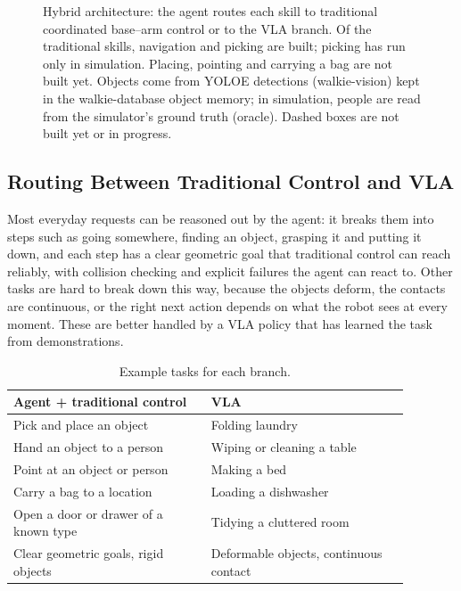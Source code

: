 \documentclass[12pt,a4paper]{article}
\begin{document}
\begin{figure}[H]
    \caption{\small{Hybrid architecture: the agent routes each skill to traditional coordinated base--arm
    control or to the VLA branch. Of the traditional skills, navigation and picking are built; picking has run
    only in simulation. Placing, pointing and carrying a bag are not built yet. Objects come from YOLOE
    detections (walkie-vision) kept in the walkie-database object memory; in simulation, people are read from
    the simulator's ground truth (oracle). Dashed boxes are not built yet or in progress.}}
    \label{fig:arch}
\end{figure}

\subsection{Routing Between Traditional Control and VLA}

Most everyday requests can be reasoned out by the agent: it breaks them into steps such as going
somewhere, finding an object, grasping it and putting it down, and each step has a clear geometric
goal that traditional control can reach reliably, with collision checking and explicit failures the
agent can react to. Other tasks are hard to break down this way, because the objects deform, the
contacts are continuous, or the right next action depends on what the robot sees at every moment.
These are better handled by a VLA policy that has learned the task from demonstrations.

\begin{table}[H]
    \centering
    \small
    \renewcommand{\arraystretch}{1.2}
    \begin{tabular}{p{0.44\linewidth} p{0.44\linewidth}}
        \toprule
        Agent + traditional control & VLA \\
        \midrule
        Pick and place an object & Folding laundry \\
        Hand an object to a person & Wiping or cleaning a table \\
        Point at an object or person & Making a bed \\
        Carry a bag to a location & Loading a dishwasher \\
        Open a door or drawer of a known type & Tidying a cluttered room \\
        \midrule
        Clear geometric goals, rigid objects & Deformable objects, continuous contact \\
        \bottomrule
    \end{tabular}
    \caption{\small{Example tasks for each branch.}}
    \label{tab:routing}
\end{table}
\end{document}
